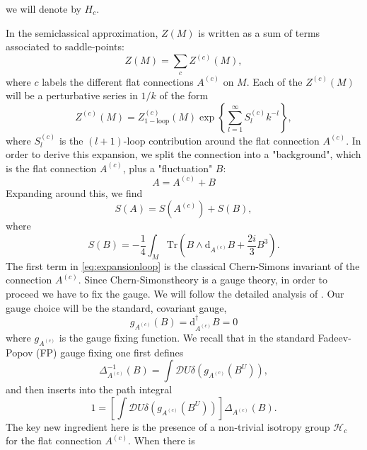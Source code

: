 we will denote by $H_c$.
\par In the semiclassical approximation, $Z(M)$ is written as a sum
of terms associated to saddle-points:
\begin{equation}
  Z(M) = \sum_c Z^{(c)}(M),
\end{equation}
where $c$ labels the different flat connections $A^{(c)}$ on $M$. Each of the
$Z^{(c)}(M)$ will be a perturbative series in $1/k$ of the form
\begin{equation}
  Z^{(c)}(M)
  =  Z^{(c)}_{\mathrm{1-loop}}(M)\exp\left\{\sum_{l=1}^{\infty}S_l^{(c)}k^{-l}\right\},
\end{equation}
where $S_l^{(c)}$ is the $(l+1)$-loop contribution around the 
flat connection $A^{(c)}$. In order to derive this expansion, we
split the connection into a "background", which is the flat connection
$A^{(c)}$, plus a "fluctuation" $B$:
\begin{equation}
  A = A^{(c)}+B
\end{equation}
Expanding around this, we find
\begin{equation}
  S(A) = S(A^{(c)})+S(B),
  \label{eq:expansionloop}
\end{equation}
where 
\begin{equation}
  S(B) = -\frac{1}{4}\int_M \mathrm{Tr}(B\wedge\mathrm{d}_{A^{(c)}}B
  + \frac{2i}{3}B^3).
\end{equation}
The first term in \eqref{eq:expansionloop} is the classical
Chern-Simons invariant of the connection $A^{(c)}$. Since Chern-Simonstheory is
a gauge theory, in order to proceed we have to fix the gauge. We will
follow the detailed analysis of \cite{Adams97}. Our gauge choice
will be the standard, covariant gauge,
\begin{equation}
  g_{A^{(c)}}(B) = \mathrm{d}^\dagger_{A^{(c)}}B=0
\end{equation}
where $g_{A^{(c)}}$ is the gauge fixing function. We recall that in the
standard Fadeev-Popov (FP) gauge fixing one first defines
\begin{equation}
  \Delta^{-1}_{A^{(c)}}(B) = \int\mathcal{D}U\delta(g_{A^{(c)}}(B^U)),
  \label{eq:fpgaugefixing}
\end{equation}
and then inserts into the path integral
\begin{equation}
1 = \left[\int\mathcal{D}U\delta(g_{A^{(c)}}(B^U))\right]\Delta_{A^{(c)}}(B).
\end{equation}
The key new ingredient here is the presence of a  non-trivial isotropy
group $\mathcal{H}_c$ for the flat connection $A^{(c)}$. When there is
